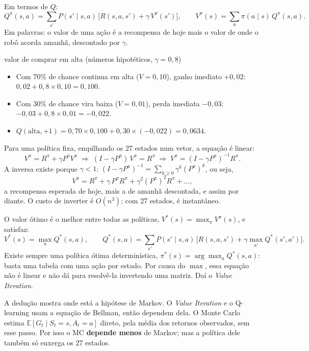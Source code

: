 \documentclass[11pt,a4paper]{article}
\newcommand{\bloco}[1]{\par\needspace{4\baselineskip}{\bfseries #1}\par\nopagebreak}
\begin{document}
Em termos de $Q$:
\[
  Q^\pi(s,a) = \sum_{s'} P(s' \mid s,a)\,\big[R(s,a,s') + \gamma\, V^\pi(s')\big], \qquad
  V^\pi(s) = \sum_a \pi(a \mid s)\, Q^\pi(s,a).
\]
Em palavras: o valor de uma ação é a recompensa de hoje mais o valor de onde o robô acorda amanhã, descontado por $\gamma$.

\begin{exemplo}{valor de comprar em alta (números hipotéticos, $\gamma = 0{,}8$)}
\begin{itemize}
  \item Com 70\% de chance continua em alta ($V = 0{,}10$), ganho imediato $+0{,}02$: $0{,}02 + 0{,}8 \times 0{,}10 = 0{,}100$.
  \item Com 30\% de chance vira baixa ($V = 0{,}01$), perda imediata $-0{,}03$: $-0{,}03 + 0{,}8 \times 0{,}01 = -0{,}022$.
  \item $Q(\text{alta}, +1) = 0{,}70 \times 0{,}100 + 0{,}30 \times (-0{,}022) = 0{,}0634$.
\end{itemize}
\end{exemplo}

\bloco{Forma matricial}
Para uma política fixa, empilhando os 27 estados num vetor, a equação é linear:
\[
  V^\pi = R^\pi + \gamma P^\pi V^\pi \;\Longrightarrow\; (I - \gamma P^\pi)\,V^\pi = R^\pi \;\Longrightarrow\; V^\pi = (I - \gamma P^\pi)^{-1} R^\pi.
\]
A inversa existe porque $\gamma < 1$: $(I - \gamma P^\pi)^{-1} = \sum_{k \ge 0} \gamma^k (P^\pi)^k$, ou seja,
\[
  V^\pi = R^\pi + \gamma\, P^\pi R^\pi + \gamma^2 (P^\pi)^2 R^\pi + \dots,
\]
a recompensa esperada de hoje, mais a de amanhã descontada, e assim por diante. O custo de inverter é $O(n^3)$; com 27 estados, é instantâneo.

\bloco{Otimalidade}
O valor ótimo é o melhor entre todas as políticas, $V^*(s) = \max_\pi V^\pi(s)$, e satisfaz:
\[
  V^*(s) = \max_a Q^*(s,a), \qquad
  Q^*(s,a) = \sum_{s'} P(s' \mid s,a)\,\Big[R(s,a,s') + \gamma \max_{a'} Q^*(s',a')\Big].
\]
Existe sempre uma política ótima determinística, $\pi^*(s) = \arg\max_a Q^*(s,a)$: basta uma tabela com uma ação por estado. Por causa do $\max$, essa equação não é linear e não dá para resolvê-la invertendo uma matriz. Daí o \textit{Value Iteration}.

\begin{defesa}
A dedução mostra onde está a hipótese de Markov. O \textit{Value Iteration} e o Q-learning usam a equação de Bellman, então dependem dela. O Monte Carlo estima $\mathbb{E}[G_t \mid S_t = s, A_t = a]$ direto, pela média dos retornos observados, sem esse passo. Por isso o MC \textbf{depende menos} de Markov; mas a política dele também só enxerga os 27 estados.
\end{defesa}
\end{document}
